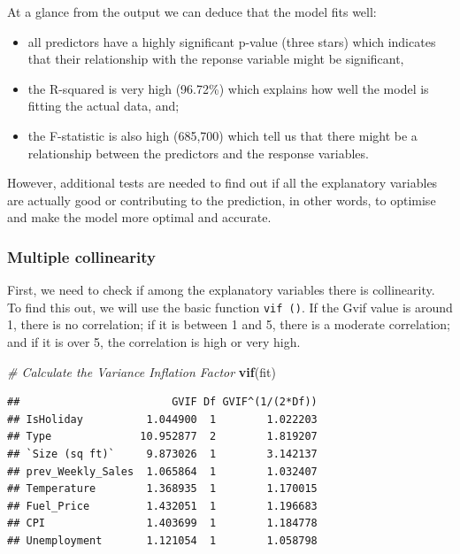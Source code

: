 \documentclass[11pt,]{article}
\newenvironment{Shaded}{\begin{snugshade}}{\end{snugshade}}
\newcommand{\KeywordTok}[1]{\textcolor[rgb]{0.13,0.29,0.53}{\textbf{{#1}}}}
\newcommand{\CommentTok}[1]{\textcolor[rgb]{0.56,0.35,0.01}{\textit{{#1}}}}
\newcommand{\NormalTok}[1]{{#1}}
\begin{document}
At a glance from the output we can deduce that the model fits well:

\begin{itemize}
\item
  all predictors have a highly significant p-value (three stars) which
  indicates that their relationship with the reponse variable might be
  significant,
\item
  the R-squared is very high (96.72\%) which explains how well the model
  is fitting the actual data, and;
\item
  the F-statistic is also high (685,700) which tell us that there might
  be a relationship between the predictors and the response variables.
\end{itemize}

However, additional tests are needed to find out if all the explanatory
variables are actually good or contributing to the prediction, in other
words, to optimise and make the model more optimal and accurate.

\subsubsection{Multiple collinearity}\label{multiple-collinearity}

First, we need to check if among the explanatory variables there is
collinearity. To find this out, we will use the basic function
\texttt{vif\ ()}. If the Gvif value is around 1, there is no
correlation; if it is between 1 and 5, there is a moderate correlation;
and if it is over 5, the correlation is high or very high.

\begin{Shaded}
\begin{Highlighting}[]
\CommentTok{# Calculate the Variance Inflation Factor}
\KeywordTok{vif}\NormalTok{(fit)}
\end{Highlighting}
\end{Shaded}

\begin{verbatim}
##                        GVIF Df GVIF^(1/(2*Df))
## IsHoliday          1.044900  1        1.022203
## Type              10.952877  2        1.819207
## `Size (sq ft)`     9.873026  1        3.142137
## prev_Weekly_Sales  1.065864  1        1.032407
## Temperature        1.368935  1        1.170015
## Fuel_Price         1.432051  1        1.196683
## CPI                1.403699  1        1.184778
## Unemployment       1.121054  1        1.058798
\end{verbatim}
\end{document}
